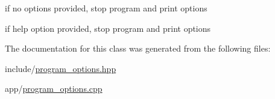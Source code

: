 if no options provided, stop program and print options

if help option provided, stop program and print options 

The documentation for this class was generated from the following files\+:\begin{DoxyCompactItemize}
\item 
include/\hyperlink{program__options_8hpp}{program\+\_\+options.\+hpp}\item 
app/\hyperlink{program__options_8cpp}{program\+\_\+options.\+cpp}\end{DoxyCompactItemize}
